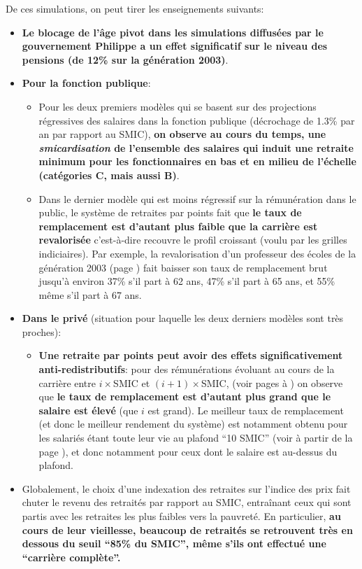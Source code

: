 De ces simulations, on peut tirer les enseignements suivants:
\begin{itemize}
\item {\bf Le blocage de l'âge pivot dans les simulations diffusées par le gouvernement Philippe a un effet significatif sur le niveau des pensions (de 12\% sur la génération 2003)}. 
\item {\bf Pour la fonction publique}:
  \begin{itemize}
  \item Pour les deux premiers modèles qui se basent sur des projections régressives des salaires dans la fonction publique (décrochage de 1.3\% par an par rapport au SMIC), {\bf on observe au cours du temps,  une \emph{smicardisation} de l'ensemble des salaires qui induit une retraite minimum pour les fonctionnaires en bas et en milieu de l'échelle (catégories C, mais aussi B)}.
  \item Dans le dernier modèle qui est moins régressif sur la rémunération dans le public, le système de retraites par points fait que {\bf le taux de remplacement est d'autant plus faible que la carrière est revalorisée} c'est-à-dire recouvre le profil croissant (voulu par les grilles indiciaires). Par exemple, la revalorisation d'un professeur des écoles de la génération 2003 (page \pageref{ProfEcoles_100_2003_22_0}) fait baisser son taux de remplacement brut jusqu'à environ 37\% s'il part à 62 ans, 47\% s'il part à 65 ans, et 55\% même s'il part à 67 ans.
  \end{itemize}
\item {\bf Dans le privé} (situation pour laquelle les deux derniers modèles sont très proches):
  \begin{itemize}
  \item {\bf Une retraite par points peut avoir des effets significativement anti-redistributifs}: pour des rémunérations évoluant au cours de la carrière entre $i \times$SMIC et $(i+1)\times$SMIC, (voir pages \pageref{Ascendant12_100_1975_22_0} à \pageref{Ascendant45_100_2003_22_0}) on observe que {\bf le taux de remplacement est d'autant plus grand que le salaire est élevé} (que $i$ est grand). Le meilleur taux de remplacement (et donc le meilleur rendement du système) est notamment obtenu pour les salariés étant toute leur vie au plafond ``10 SMIC'' (voir à partir de la page \pageref{10SMIC_100_1975_22_0}), et donc notamment pour ceux dont le salaire est au-dessus du plafond.
  \end{itemize}
\item Globalement, le choix d'une indexation des retraites sur l'indice des prix fait chuter le revenu des retraités par rapport au SMIC, entraînant ceux qui sont partis avec les retraites les plus faibles vers la pauvreté. En particulier, {\bf au cours de leur vieillesse, beaucoup de retraités se retrouvent très en dessous du seuil ``85\% du SMIC'', même s'ils ont effectué une ``carrière complète''.}

\end{itemize}
